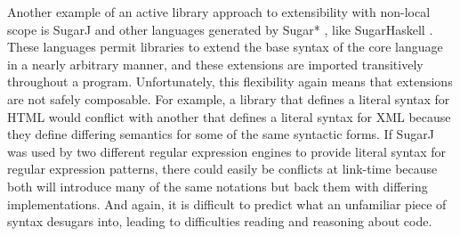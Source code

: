 Another example of an active library approach to extensibility with non-local scope is SugarJ \cite{erdweg2011sugarj} and other languages generated by Sugar* \cite{erdweg2013framework}, like SugarHaskell \cite{erdweg2012layout}. These languages permit libraries to extend the base syntax of the core language in a nearly arbitrary manner, and these extensions are imported transitively throughout a program. Unfortunately, this flexibility again means that  extensions are  not safely composable. For example, a library that defines a literal syntax for HTML would conflict with another that defines a literal syntax for XML because they define differing semantics for some of the same syntactic forms. If SugarJ was used by two different regular expression engines to provide literal syntax for regular expression patterns, there could easily be conflicts at link-time because both will introduce many of the same notations but back them with differing implementations. 
And again, it is difficult to predict what an unfamiliar piece of syntax desugars into, leading to difficulties reading and reasoning about code.





